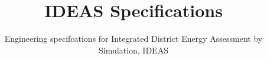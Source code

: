 \documentclass[graybox,envcountchap,sectrefs]{svmono}
\begin{document}
\title{IDEAS Specifications}
\subtitle{Engineering specifcations for Integrated District Energy Assessment by Simulation, IDEAS}
\maketitle

\end{document}
